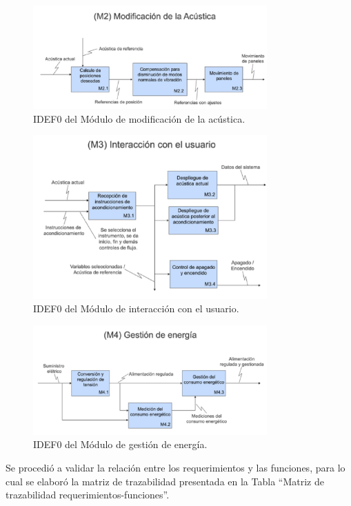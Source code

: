 \begin{figure}[!htb]
    \centering
    \includegraphics[width=0.8\textwidth]{imagenes/8.jpg}
    \caption{\footnotesize IDEF0 del Módulo de modificación de la acústica.}
    \label{fig:IDEF0_M2}
\end{figure}
\FloatBarrier

\begin{figure}[!htb]
    \centering
    \includegraphics[width=0.8\textwidth]{imagenes/9.jpg}
    \caption{\footnotesize IDEF0 del Módulo de interacción con el usuario.}
    \label{fig:IDEF0_M3}
\end{figure}
\FloatBarrier

\begin{figure}[!htb]
    \centering
    \includegraphics[width=0.8\textwidth]{imagenes/10.jpg}
    \caption{\footnotesize IDEF0 del Módulo de gestión de energía.}
    \label{fig:IDEF0_M4}
\end{figure}
\FloatBarrier
Se procedió a validar la relación entre los requerimientos y las funciones, para lo cual se elaboró la matriz de trazabilidad presentada en la Tabla “Matriz de trazabilidad requerimientos-funciones”.

